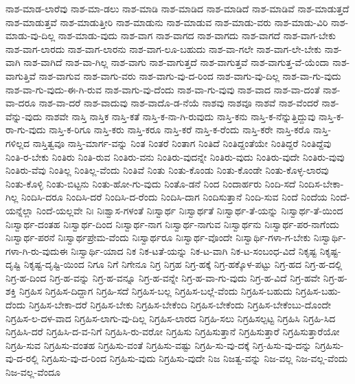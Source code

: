 {ನಾಶ-ಮಾಡ-ಲಾರೆವು
ನಾಶ-ಮಾ-ಡಲು
ನಾಶ-ಮಾಡಿ
ನಾಶ-ಮಾಡಿದ
ನಾಶ-ಮಾಡಿದೆ
ನಾಶ-ಮಾಡಿವೆ
ನಾಶ-ಮಾಡುತ್ತದೆ
ನಾಶ-ಮಾಡುತ್ತವೆ
ನಾಶ-ಮಾಡುತ್ತೀರಿ
ನಾಶ-ಮಾಡುನು
ನಾಶ-ಮಾಡುವ
ನಾಶ-ಮಾಡು-ವರು
ನಾಶ-ಮಾಡು-ವಿರಿ
ನಾಶ-ಮಾಡು-ವು-ದಿಲ್ಲ
ನಾಶ-ಮಾಡು-ವುದು
ನಾಶ-ವಾಗ
ನಾಶ-ವಾಗದ
ನಾಶ-ವಾಗದು
ನಾಶ-ವಾಗದೆ
ನಾಶ-ವಾಗ-ಬೇಕು
ನಾಶ-ವಾಗ-ಲಾರದು
ನಾಶ-ವಾಗ-ಲಾರನು
ನಾಶ-ವಾಗ-ಲೂ-ಬಹುದು
ನಾಶ-ವಾ-ಗಲೇ
ನಾಶ-ವಾಗ-ಲೇ-ಬೇಕು
ನಾಶ-ವಾಗಿ
ನಾಶ-ವಾಗಿದೆ
ನಾಶ-ವಾ-ಗಿಲ್ಲ
ನಾಶ-ವಾಗು
ನಾಶ-ವಾಗುತ್ತದೆ
ನಾಶ-ವಾಗುತ್ತವೆ
ನಾಶ-ವಾಗುತ್ತ-ವೆ-ಯೆಂದಾ
ನಾಶ-ವಾಗುತ್ತಿವೆ
ನಾಶ-ವಾಗುವ
ನಾಶ-ವಾಗು-ವರು
ನಾಶ-ವಾಗು-ವು-ದ-ರಿಂದ
ನಾಶ-ವಾಗು-ವು-ದಿಲ್ಲ
ನಾಶ-ವಾ-ಗು-ವುದು
ನಾಶ-ವಾ-ಗು-ವುದು-ಈ-ಗಿ-ರುವ
ನಾಶ-ವಾಗು-ವು-ದೆಂದು
ನಾಶ-ವಾ-ಗು-ವುವು
ನಾಶ-ವಾದ
ನಾಶ-ವಾ-ದಂತೆ
ನಾಶ-ವಾ-ದರೂ
ನಾಶ-ವಾ-ದರೆ
ನಾಶ-ವಾದುವು
ನಾಶ-ವಾದೊ-ಡ-ನೆಯೆ
ನಾಶವು
ನಾಶವೂ
ನಾಶವೆ
ನಾಶ-ವೆಂದರೆ
ನಾಶ-ವೆನ್ನು-ವುದು
ನಾಶವೇ
ನಾಸ್ತಿ
ನಾಸ್ತಿಕ
ನಾಸ್ತಿ-ಕತೆ
ನಾಸ್ತಿ-ಕ-ನಾ-ಗಿ-ರುವುದು
ನಾಸ್ತಿ-ಕನು
ನಾಸ್ತಿ-ಕ-ನೆನ್ನುತ್ತಿದ್ದುವು
ನಾಸ್ತಿ-ಕ-ರಾ-ಗು-ವುದು
ನಾಸ್ತಿ-ಕ-ರಿಗೂ
ನಾಸ್ತಿ-ಕರು
ನಾಸ್ತಿ-ಕರೂ
ನಾಸ್ತಿ-ಕರೆ
ನಾಸ್ತಿ-ಕ-ರೆಂದು
ನಾಸ್ತಿ-ಕರೇ
ನಾಸ್ತಿ-ಕರೊ
ನಾಸ್ತಿ-ಗಳಿಲ್ಲದ
ನಾಸ್ತಿತ್ವವೂ
ನಾಸ್ತಿ-ಮಾರ್ಗ-ವನ್ನು
ನಿಂತ
ನಿಂತರೆ
ನಿಂತಾಗ
ನಿಂತಿದೆ
ನಿಂತಿದ್ದಂತೆಯೇ
ನಿಂತಿದ್ದರೆ
ನಿಂತಿದ್ದೆವು
ನಿಂತಿ-ರ-ಬೇಕು
ನಿಂತಿರು
ನಿಂತಿ-ರುವ
ನಿಂತಿರು-ವನು
ನಿಂತಿರು-ವುದನ್ನೇ
ನಿಂತಿರು-ವುದು
ನಿಂತಿರು-ವುದೇ
ನಿಂತಿರು-ವುವು
ನಿಂತಿರು-ವೆವು
ನಿಂತಿಲ್ಲ
ನಿಂತಿಲ್ಲ-ವೆಂದು
ನಿಂತಿವೆ
ನಿಂತು
ನಿಂತು-ಕೊಂಡು
ನಿಂತು-ಕೊಂಡೇ
ನಿಂತು-ಕೊಳ್ಳ-ಲಾರವು
ನಿಂತು-ಕೊಳ್ಳಿ
ನಿಂತು-ಬಿಟ್ಟನು
ನಿಂತು-ಹೋ-ಗು-ವುದು
ನಿಂತೊ-ಡನೆ
ನಿಂದ
ನಿಂದಾರ್ಹರು
ನಿಂದಿ-ಸದೆ
ನಿಂದಿಸ-ಬೇಕಾ-ಗಿಲ್ಲ
ನಿಂದಿಸಿ-ದರೂ
ನಿಂದಿಸಿ-ದರೆ
ನಿಂದಿಸಿ-ದ-ರೆಂದು
ನಿಂದಿಸಿ-ದಾಗ
ನಿಂದಿಸುತ್ತಾನೆ
ನಿಂದಿ-ಸುವ
ನಿಂದೆ
ನಿಂದೆಯ
ನಿಂದೆ-ಯನ್ನೆಲ್ಲಾ
ನಿಂದೆ-ಯಲ್ಲವೇ
ನಿಃ
ನಿಃಶ್ವಾಸ-ಗಳಂತೆ
ನಿಃಸ್ವಾರ್ಥ
ನಿಃಸ್ವಾರ್ಥತೆ
ನಿಃಸ್ವಾರ್ಥ-ತೆ-ಯನ್ನು
ನಿಃಸ್ವಾರ್ಥ-ತೆ-ಯಿಂದ
ನಿಃಸ್ವಾರ್ಥ-ದಂತಹ
ನಿಃಸ್ವಾರ್ಥ-ದಿಂದ
ನಿಃಸ್ವಾರ್ಥ-ನಾಗ
ನಿಃಸ್ವಾರ್ಥ-ನಾಗುವ
ನಿಃಸ್ವಾರ್ಥನು
ನಿಃಸ್ವಾರ್ಥ-ಪರ-ನಾಗೆಂದು
ನಿಃಸ್ವಾರ್ಥ-ಪರನೆ
ನಿಃಸ್ವಾರ್ಥಪ್ರೇಮ-ವೆಂದು
ನಿಃಸ್ವಾರ್ಥರೂ
ನಿಃಸ್ವಾರ್ಥ-ವೊಂದೇ
ನಿಃಸ್ವಾರ್ಥಿ-ಗಳಾ-ಗ-ಬೇಕು
ನಿಃಸ್ವಾರ್ಥಿ-ಗಳಾ-ಗಿ-ರು-ವುದುಈ
ನಿಃಸ್ವಾರ್ಥಿ-ಯಾದ
ನಿಕ
ನಿಕ-ಟತೆ-ಯನ್ನು
ನಿಕ-ಟ-ವಾಗಿ
ನಿಕ-ಟ-ಸಂಬಂಧ-ವಿದೆ
ನಿಕೃಷ್ಟ
ನಿಕೃಷ್ಟ-ದೃಷ್ಟಿ
ನಿಕೃಷ್ಟ-ದೃಷ್ಟಿ-ಯಿಂದ
ನಿಗೂ
ನಿಗೆ
ನಿಗೇನೂ
ನಿಗ್ರ
ನಿಗ್ರಹ
ನಿಗ್ರ-ಹಕ್ಕೆ
ನಿಗ್ರ-ಹಕ್ಕೊಳ-ಪಟ್ಟು
ನಿಗ್ರ-ಹದ
ನಿಗ್ರ-ಹ-ದಲ್ಲಿ
ನಿಗ್ರ-ಹ-ದಿಂದ
ನಿಗ್ರ-ಹ-ವನ್ನು
ನಿಗ್ರ-ಹ-ವನ್ನೂ
ನಿಗ್ರ-ಹ-ವನ್ನೇ
ನಿಗ್ರ-ಹ-ವಾ-ಗು-ವುದು
ನಿಗ್ರ-ಹ-ವಿದೆ
ನಿಗ್ರ-ಹವೇ
ನಿಗ್ರ-ಹ-ಶಕ್ತಿ
ನಿಗ್ರಹಿಸ
ನಿಗ್ರಹಿಸ-ದಿದ್ದಾಗ
ನಿಗ್ರಹಿ-ಸದೆ
ನಿಗ್ರಹಿಸ-ಬಲ್ಲ
ನಿಗ್ರಹಿಸ-ಬಲ್ಲೆ-ವೆಂದು
ನಿಗ್ರಹಿಸ-ಬಹುದು
ನಿಗ್ರಹಿಸ-ಬಹು-ದೆಂದು
ನಿಗ್ರಹಿಸ-ಬೇಕಾ-ದರೆ
ನಿಗ್ರಹಿಸ-ಬೇಕು
ನಿಗ್ರಹಿಸ-ಬೇಕೆಂದಿ
ನಿಗ್ರಹಿಸ-ಬೇಕೆಂದು
ನಿಗ್ರಹಿಸ-ಬೇಕೆಂಬು-ದೊಂದೇ
ನಿಗ್ರಹಿಸ-ಲ-ದಳ-ವಾದ
ನಿಗ್ರಹಿಸ-ಲಾಗು-ವು-ದಿಲ್ಲ
ನಿಗ್ರಹಿಸ-ಲಾರದ
ನಿಗ್ರಹಿ-ಸಲು
ನಿಗ್ರಹಿಸಲ್ಪಟ್ಟ
ನಿಗ್ರಹಿಸಿ
ನಿಗ್ರಹಿ-ಸಿದ
ನಿಗ್ರಹಿಸಿ-ದರೆ
ನಿಗ್ರಹಿಸಿ-ದ-ವ-ನಿಗೆ
ನಿಗ್ರಹಿಸಿ-ರು-ವರೋ
ನಿಗ್ರಹಿಸು
ನಿಗ್ರಹಿಸುತ್ತಾನೆ
ನಿಗ್ರಹಿಸುತ್ತಾರೆ
ನಿಗ್ರಹಿಸುತ್ತಾರೆಯೋ
ನಿಗ್ರಹಿ-ಸುವ
ನಿಗ್ರಹಿಸು-ವಂತಹ
ನಿಗ್ರಹಿಸು-ವಂತೆ
ನಿಗ್ರಹಿಸು-ವಷ್ಟು
ನಿಗ್ರಹಿ-ಸು-ವು-ದಕ್ಕೆ
ನಿಗ್ರ-ಹಿಸು-ವು-ದನ್ನು
ನಿಗ್ರಹಿಸು-ವು-ದ-ರಲ್ಲಿ
ನಿಗ್ರಹಿಸು-ವು-ದ-ರಿಂದ
ನಿಗ್ರಹಿಸು-ವುದು
ನಿಗ್ರಹಿಸು-ವುದೇ
ನಿಜ
ನಿಜತ್ವ-ವನ್ನು
ನಿಜ-ವಲ್ಲ
ನಿಜ-ವಲ್ಲ-ವೆಂದು
ನಿಜ-ವಲ್ಲ-ವೆಂದೂ
}
